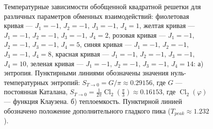 \documentclass[utf8,12pt]{jetp}
\DeclareMathOperator{\Cl}{Cl}
\begin{document}
\begin{figure}[h]
	\begin{minipage}[h]{0.5\linewidth}
	\end{minipage}
	\hfill
	\begin{minipage}[h]{0.5\linewidth}
	\end{minipage}
	\caption{Температурные зависимости обобщенной квадратной решетки для различных параметров обменных взаимодействий: фиолетовая кривая --- $J_1 = -1$, $J_2 = -1$, $J_3 = -1$, $J_4 = 1$, желтая кривая --- $J_1 = -1$, $J_2 = -1$, $J_3 = -1$, $J_4 = 2$, розовая кривая --- $J_1 = -1$, $J_2 = -1$, $J_3 = -1$, $J_4 = 5$, синяя кривая --- $J_1 = -1$, $J_2 = -1$, $J_3 = -1$, $J_4 = 8$, красная кривая --- $J_1 = -1$, $J_2 = -1$, $J_3 = -1$, $J_4 = 10$, зеленая кривая --- $J_1 = -1$, $J_2 = -1$, $J_3 = -1$, $J_4 = 14$: а) энтропия. Пунктирными линиями обозначены значения нуль-температурных энтропий: $S_{T\rightarrow 0} = G/\pi\approx 0.29156$, где $G$ --- постоянная Каталана, $S_{T\rightarrow 0} = \frac{1}{2\pi} \Cl_2 (\frac{\pi}{3})\approx0.16153$, где $\Cl_2 (\varphi)$ --- функция Клаузена. б) теплоемкость. Пунктирной линией обозначено положение дополнительного гладкого пика ($T_{peak}\approx1.232$).}
	\label{Peak}
\end{figure}
\end{document}
